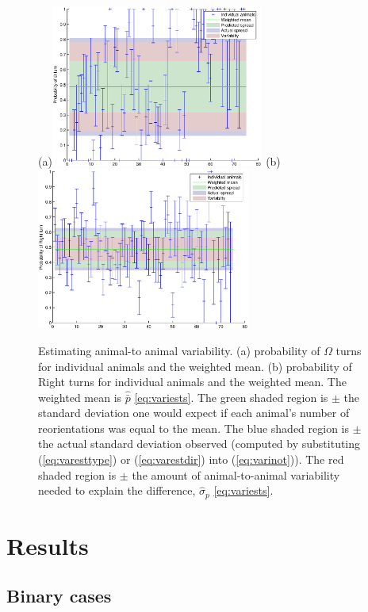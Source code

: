 \documentclass[12pt]{article}
\begin{document}
\begin{figure}
  (a)\includegraphics[width=7cm]{TypeProbs_individual.eps}
  (b)\includegraphics[width=7cm]{DirProbs_individual.eps}
  \caption[Estimating animal-to animal variability.]{Estimating animal-to animal variability. (a) probability of $\Omega$ turns for individual animals and the weighted mean. (b) probability of Right turns for individual animals and the weighted mean. The weighted mean is $\hat{\bar{p}}$ \eqref{eq:variests}.
  The green shaded region is $\pm$ the standard deviation one would expect if each animal's number of reorientations was equal to the mean.
  The blue shaded region is $\pm$ the actual standard deviation observed (computed by substituting (\ref{eq:varesttype}) or (\ref{eq:varestdir}) into (\ref{eq:varinot})).
  The red shaded region is $\pm$ the amount of animal-to-animal variability needed to explain the difference, $\hat{\sigma}_p$ \eqref{eq:variests}. }\label{fig:variability}
\end{figure}


\section{Results}\label{sec:results}


\subsection{Binary cases}\label{sec:binaryresults}
\end{document}
